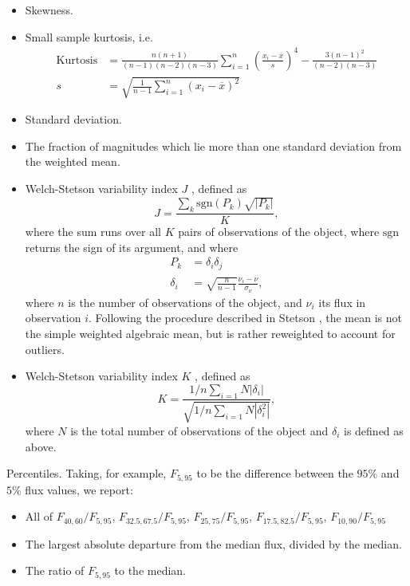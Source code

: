 \begin{itemize}
\item{Skewness.}
\item{Small sample kurtosis, i.e.
\begin{align}
\mathrm{Kurtosis} &= \frac{n(n+1)}{(n-1)(n-2)(n-3)} \sum_{i=1}^{n} \left(\frac{x_i - \overline{x}}{s}\right)^4 -\frac{3(n-1)^2}{(n-2)(n-3)} \\
s &= \sqrt{\frac{1}{n-1} \sum_{i=1}^{n}(x_i - \overline{x})^2}
\end{align}
}
\item{Standard deviation.}
\item{The fraction of magnitudes which lie more than one standard deviation from the weighted mean.}
\item{Welch-Stetson variability index $J$ \cite{1996PASP..108..851S}, defined as
\[
J = \frac{\sum_{k} \mathrm{sgn}(P_k) \sqrt{|P_k|}}{K},
\]
where the sum runs over all $K$ pairs of observations of the object, where $\mathrm{sgn}$ returns the sign of its argument, and where
\begin{align}
P_k &= \delta_i \delta_j \\
\delta_i &= \sqrt{\frac{n}{n-1}}\frac{\nu_i - \overline{\nu}}{\sigma_{\nu}},
\end{align}
where $n$ is the number of observations of the object, and $\nu_i$ its flux in observation $i$. Following the procedure described in Stetson \cite{1996PASP..108..851S}, the mean is not the simple weighted algebraic mean, but is rather reweighted to account for outliers.}
\item{Welch-Stetson variability index $K$ \cite{1996PASP..108..851S}, defined as
\[
K = \frac{1/n \sum_{i=1}{N}|\delta_i|}{\sqrt{1/n \sum_{i=1}{N}|\delta_i^2|}},
\]
where $N$ is the total number of observations of the object and $\delta_i$ is defined as above.}
\end{itemize}

Percentiles. Taking, for example, $F_{5,95}$ to be the difference between the $95\%$ and $5\%$ flux values, we report:

\begin{itemize}
\item{All of $F_{40,60} / F_{5,95}$, $F_{32.5,67.5} / F_{5,95}$, $F_{25,75} / F_{5,95}$, $F_{17.5,82.5} / F_{5,95}$, $F_{10,90} / F_{5,95}$}
\item{The largest absolute departure from the median flux, divided by the
median.}
\item{The ratio of $F_{5,95}$ to the median.}
\end{itemize}

